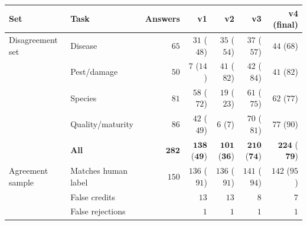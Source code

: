 \begin{tabular}{llrrrrr}
\toprule
\textbf{Set} & \textbf{Task} & \textbf{Answers} & \textbf{v1} & \textbf{v2} & \textbf{v3} & \textbf{v4 (final)} \\
\midrule
Disagreement set & Disease & $65$ & $31$ ($48$) & $35$ ($54$) & $37$ ($57$) & $44$ ($68$) \\
 & Pest/damage & $50$ & $7$ ($14$) & $41$ ($82$) & $42$ ($84$) & $41$ ($82$) \\
 & Species & $81$ & $58$ ($72$) & $19$ ($23$) & $61$ ($75$) & $62$ ($77$) \\
 & Quality/maturity & $86$ & $42$ ($49$) & $6$ ($7$) & $70$ ($81$) & $77$ ($90$) \\
 & \textbf{All} & $\mathbf{282}$ & $\mathbf{138}$ ($\mathbf{49}$) & $\mathbf{101}$ ($\mathbf{36}$) & $\mathbf{210}$ ($\mathbf{74}$) & $\mathbf{224}$ ($\mathbf{79}$) \\
\midrule
Agreement sample & Matches human label & $150$ & $136$ ($91$) & $136$ ($91$) & $141$ ($94$) & $142$ ($95$) \\
 & False credits & & $13$ & $13$ & $8$ & $7$ \\
 & False rejections & & $1$ & $1$ & $1$ & $1$ \\
\bottomrule
\end{tabular}
